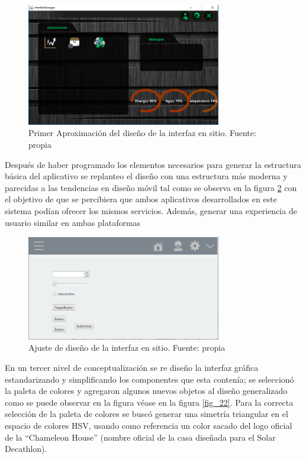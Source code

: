 \begin{figure}[htbp]
	\centerline{\includegraphics[width=8.5cm]{./figuras/houseManager23.png}}
	\caption{Primer Aproximación del diseño de la interfaz en sitio. Fuente: propia}
	\label{fig_5}
\end{figure}

Después de haber programado los elementos necesarios para generar la estructura básica del aplicativo se replanteo el diseño con una estructura más moderna y parecidas a las tendencias en diseño móvil tal como se observa en la figura \ref{fig_21} con el objetivo de que se percibiera que ambos aplicativos desarrollados en este sistema podían ofrecer los mismos servicios. Además, generar una experiencia de usuario similar en ambas plataformas

\begin{figure}[htbp]
	\centerline{\includegraphics[width=8.5cm]{./figuras/house_manager_version_2.png}}
	\caption{Ajuste de diseño de la interfaz en sitio. Fuente: propia}
	\label{fig_21}
\end{figure}

En un tercer nivel de conceptualización se re diseño la interfaz gráfica estandarizando y simplificando los componentes que esta contenía; se seleccionó la paleta de colores y agregaron algunos nuevos objetos al diseño generalizado como se puede observar en la figura véase en la figura \ref{fig_22}. Para la correcta selección de la paleta de colores se buscó generar una simetría triangular en el espacio de colores HSV, usando como referencia un color sacado del logo oficial de la ``Chameleon House'' (nombre oficial de la casa diseñada para el Solar Decathlon). 

